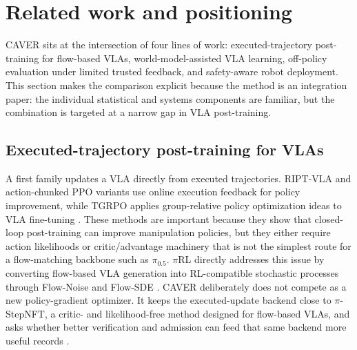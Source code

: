 \documentclass[10pt]{article}
\theoremstyle{plain}
\theoremstyle{definition}
\theoremstyle{remark}
\begin{document}
\section{Related work and positioning}\label{sec:related}
CAVER sits at the intersection of four lines of work: executed-trajectory post-training for flow-based VLAs, world-model-assisted VLA learning, off-policy evaluation under limited trusted feedback, and safety-aware robot deployment. This section makes the comparison explicit because the method is an integration paper: the individual statistical and systems components are familiar, but the combination is targeted at a narrow gap in VLA post-training.

\subsection{Executed-trajectory post-training for VLAs}
A first family updates a VLA directly from executed trajectories. RIPT-VLA and action-chunked PPO variants use online execution feedback for policy improvement, while TGRPO applies group-relative policy optimization ideas to VLA fine-tuning \citep{tan2025riptvla,wang2025actionchunkppo,chen2025tgrpo}. These methods are important because they show that closed-loop post-training can improve manipulation policies, but they either require action likelihoods or critic/advantage machinery that is not the simplest route for a flow-matching backbone such as $\pi_{0.5}$. $\pi$RL directly addresses this issue by converting flow-based VLA generation into RL-compatible stochastic processes through Flow-Noise and Flow-SDE \citep{chen2025pirl}. CAVER deliberately does not compete as a new policy-gradient optimizer. It keeps the executed-update backend close to $\pi$-StepNFT, a critic- and likelihood-free method designed for flow-based VLAs, and asks whether better verification and admission can feed that same backend more useful records \citep{wang2026pistepnft,pistepnftrepo2026}.
\end{document}
